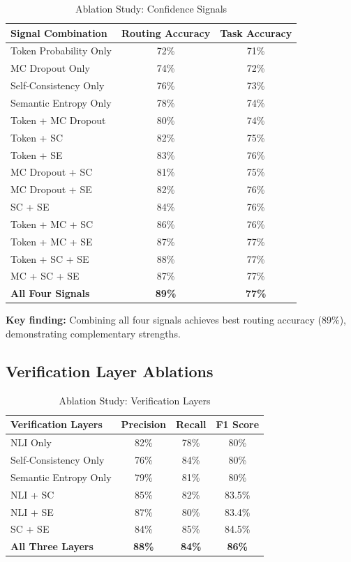 \documentclass[12pt,a4paper]{article}
\theoremstyle{definition}
\begin{document}
\begin{table}[htbp]
\centering
\caption{Ablation Study: Confidence Signals}
\begin{tabular}{lcc}
\toprule
\textbf{Signal Combination} & \textbf{Routing Accuracy} & \textbf{Task Accuracy} \\
\midrule
Token Probability Only & 72\% & 71\% \\
MC Dropout Only & 74\% & 72\% \\
Self-Consistency Only & 76\% & 73\% \\
Semantic Entropy Only & 78\% & 74\% \\
\midrule
Token + MC Dropout & 80\% & 74\% \\
Token + SC & 82\% & 75\% \\
Token + SE & 83\% & 76\% \\
MC Dropout + SC & 81\% & 75\% \\
MC Dropout + SE & 82\% & 76\% \\
SC + SE & 84\% & 76\% \\
\midrule
Token + MC + SC & 86\% & 76\% \\
Token + MC + SE & 87\% & 77\% \\
Token + SC + SE & 88\% & 77\% \\
MC + SC + SE & 87\% & 77\% \\
\midrule
\textbf{All Four Signals} & \textbf{89\%} & \textbf{77\%} \\
\bottomrule
\end{tabular}
\end{table}

\textbf{Key finding:} Combining all four signals achieves best routing accuracy (89\%), demonstrating complementary strengths.

\subsection{Verification Layer Ablations}

\begin{table}[htbp]
\centering
\caption{Ablation Study: Verification Layers}
\begin{tabular}{lccc}
\toprule
\textbf{Verification Layers} & \textbf{Precision} & \textbf{Recall} & \textbf{F1 Score} \\
\midrule
NLI Only & 82\% & 78\% & 80\% \\
Self-Consistency Only & 76\% & 84\% & 80\% \\
Semantic Entropy Only & 79\% & 81\% & 80\% \\
\midrule
NLI + SC & 85\% & 82\% & 83.5\% \\
NLI + SE & 87\% & 80\% & 83.4\% \\
SC + SE & 84\% & 85\% & 84.5\% \\
\midrule
\textbf{All Three Layers} & \textbf{88\%} & \textbf{84\%} & \textbf{86\%} \\
\bottomrule
\end{tabular}
\end{table}
\end{document}
